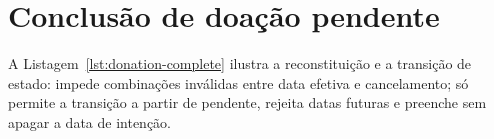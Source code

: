 \section{Conclusão de doação pendente}

A Listagem~\ref{lst:donation-complete} ilustra a reconstituição e a transição de estado:  impede combinações inválidas entre data efetiva e cancelamento;  só permite a transição a partir de pendente, rejeita datas futuras e preenche  sem apagar a data de intenção.


